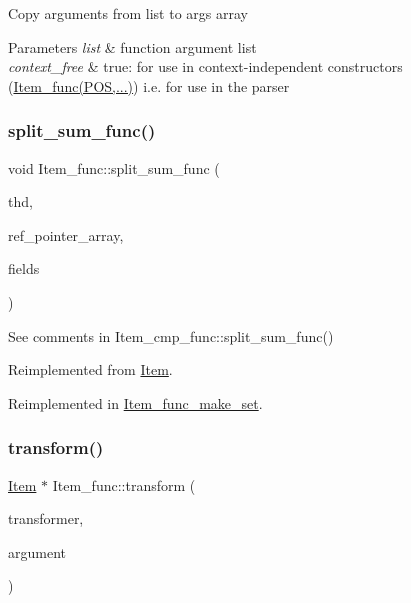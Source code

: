 Copy arguments from list to args array


\begin{DoxyParams}{Parameters}
{\em list} & function argument list \\
\hline
{\em context\+\_\+free} & true\+: for use in context-\/independent constructors (\mbox{\hyperlink{classItem__func}{Item\+\_\+func(\+P\+O\+S,...)}}) i.\+e. for use in the parser \\
\hline
\end{DoxyParams}
\mbox{\label{classItem__func_a893eba2921ac100faa99edd67879561b}} 
\subsubsection{\texorpdfstring{split\+\_\+sum\+\_\+func()}{split\_sum\_func()}}
{\footnotesize\ttfamily void Item\+\_\+func\+::split\+\_\+sum\+\_\+func (\begin{DoxyParamCaption}\item[{T\+HD $\ast$}]{thd,  }\item[{\mbox{\hyperlink{classBounds__checked__array}{Ref\+\_\+ptr\+\_\+array}}}]{ref\+\_\+pointer\+\_\+array,  }\item[{\mbox{\hyperlink{classList}{List}}$<$ \mbox{\hyperlink{classItem}{Item}} $>$ \&}]{fields }\end{DoxyParamCaption})\hspace{0.3cm}{\ttfamily [virtual]}}

See comments in Item\+\_\+cmp\+\_\+func\+::split\+\_\+sum\+\_\+func() 

Reimplemented from \mbox{\hyperlink{classItem}{Item}}.



Reimplemented in \mbox{\hyperlink{classItem__func__make__set_a0861efd2c2bac3164cfd61888040a092}{Item\+\_\+func\+\_\+make\+\_\+set}}.

\mbox{\label{classItem__func_a808d0fe427eec3c050ee5214594b8908}} 
\subsubsection{\texorpdfstring{transform()}{transform()}}
{\footnotesize\ttfamily \mbox{\hyperlink{classItem}{Item}} $\ast$ Item\+\_\+func\+::transform (\begin{DoxyParamCaption}\item[{Item\+\_\+transformer}]{transformer,  }\item[{uchar $\ast$}]{argument }\end{DoxyParamCaption})\hspace{0.3cm}{\ttfamily [virtual]}}

